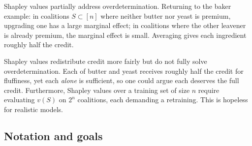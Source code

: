 \documentclass[11pt]{article}
\begin{document}
Shapley values partially address overdetermination. Returning to the baker example: in coalitions $S\subset [n]$ where neither butter nor yeast is premium, upgrading one has a large marginal effect; in coalitions where the other leavener is already premium, the marginal effect is small. Averaging gives each ingredient roughly half the credit.


%

\begin{remark}\label{rem:shapley-limit}
  Shapley values redistribute credit more fairly but do not fully solve overdetermination. Each of butter and yeast receives roughly half the credit for fluffiness, yet each \emph{alone} is sufficient, so one could argue each deserves the full credit. Furthermore, Shapley values over a training set of size $n$ require evaluating $v(S)$ on $2^n$ coalitions, each demanding a retraining. This is hopeless for realistic models. 
\end{remark}

\subsection{Notation and goals}\label{subsec:convention}
\end{document}
